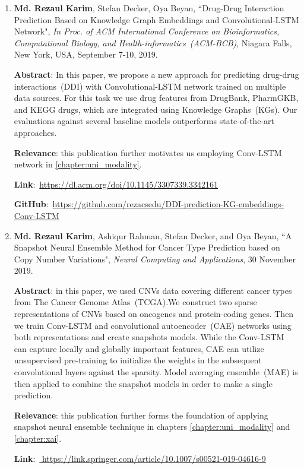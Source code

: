 \begin{enumerate}
	\item \textbf{Md. Rezaul Karim}, Stefan Decker, Oya Beyan, ``Drug-Drug Interaction Prediction Based on Knowledge Graph Embeddings and Convolutional-LSTM Network", \emph{In Proc. of ACM International Conference on Bioinformatics, Computational Biology, and Health-informatics~(ACM-BCB)}, Niagara Falls, New York, USA, September 7-10, 2019.
	
	\textbf{Abstract}: In this paper, we propose a new approach for predicting drug-drug interactions~(DDI) with Convolutional-LSTM network trained on multiple data sources. For this task we use drug features from DrugBank, PharmGKB, and KEGG drugs, which are integrated using Knowledge Graphs~(KGs). Our evaluations against several baseline models outperforms state-of-the-art approaches. 
	
	\textbf{Relevance}: this publication further motivates us employing Conv-LSTM network in \cref{chapter:uni_modality}.
	
	\textbf{Link}:~\url{https://dl.acm.org/doi/10.1145/3307339.3342161}

	\textbf{GitHub}:~\url{https://github.com/rezacsedu/DDI-prediction-KG-embeddings-Conv-LSTM}
	
	\item \textbf{Md. Rezaul Karim}, Ashiqur Rahman, Stefan Decker, and Oya Beyan, ``A Snapshot Neural Ensemble Method for Cancer Type Prediction based on Copy Number Variations", \emph{Neural Computing and Applications}, 30 November 2019. 
	
	\textbf{Abstract}: in this paper, we used CNVs data covering different cancer types from The Cancer Genome Atlas~(TCGA).We construct two sparse representations of CNVs based on oncogenes and protein-coding genes. Then we train Conv-LSTM and convolutional autoencoder~(CAE) networks using both representations and create snapshots models. While the Conv-LSTM can capture locally and globally important features, CAE can utilize unsupervised pre-training to initialize the weights in the subsequent convolutional layers against the sparsity. Model averaging ensemble~(MAE) is then applied to combine the snapshot models in order to make a single prediction. 
	
	\textbf{Relevance}: this publication further forms the foundation of applying snapshot neural ensemble technique in chapters \ref{chapter:uni_modality} and \ref{chapter:xai}.
	
	\textbf{Link}:~\url{	https://link.springer.com/article/10.1007/s00521-019-04616-9}
	

\end{enumerate}
